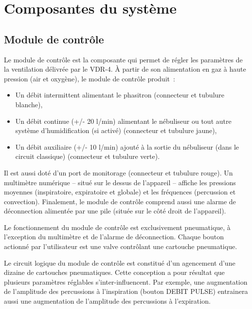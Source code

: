 \chapter{Composantes du système}

\section{Module de contrôle}

Le module de contrôle est la composante qui permet de régler les paramètres de
la ventilation délivrée par le VDR-4.  À partir de son alimentation en gaz à
haute pression (air et oxygène), le module de contrôle produit :

\begin{itemize}
	\item Un débit intermittent alimentant le phasitron (connecteur et tubulure blanche),
	\item Un débit continue (+/- 20 l/min) alimentant le nébuliseur ou tout autre système d’humidification (si activé) (connecteur et tubulure jaune),
	\item Un débit auxiliaire (+/- 10 l/min) ajouté à la sortie du nébuliseur (dans le circuit classique) (connecteur et tubulure verte).
\end{itemize}

Il est aussi doté d'un port de monitorage (connecteur et tubulure rouge). 
Un multimètre numérique -- situé sur le dessus de l'appareil -- affiche les
pressions moyennes (inspiratoire, expiratoire et globale) et les fréquences
(percussion et convection).  Finalement, le module de contrôle comprend aussi
une alarme de déconnection alimentée par une pile (située sur le côté droit de
l'appareil).

Le fonctionnement du module de contrôle est exclusivement pneumatique, à
l'exception du multimètre et de l'alarme de déconnection.  Chaque bouton
actionné par l'utilisateur est une valve contrôlant une cartouche pneumatique. 

Le circuit logique du module de contrôle est constitué d'un agencement d'une
dizaine de cartouches pneumatiques.  Cette conception a pour résultat que
plusieurs paramètres réglables s'inter-influencent.  Par exemple, une
augmentation de l'amplitude des percussions à l'inspiration (bouton DEBIT PULSE)
entrainera aussi une augmentation  de l'amplitude des percussions à
l'expiration.


